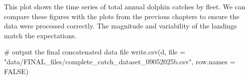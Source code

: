 \documentclass[
  letterpaper,
  oneside,
  open=any]{scrbook}
\newenvironment{Shaded}{\begin{snugshade}}{\end{snugshade}}
\newcommand{\AttributeTok}[1]{\textcolor[rgb]{0.40,0.45,0.13}{#1}}
\newcommand{\CommentTok}[1]{\textcolor[rgb]{0.37,0.37,0.37}{#1}}
\newcommand{\ConstantTok}[1]{\textcolor[rgb]{0.56,0.35,0.01}{#1}}
\newcommand{\FunctionTok}[1]{\textcolor[rgb]{0.28,0.35,0.67}{#1}}
\newcommand{\NormalTok}[1]{\textcolor[rgb]{0.00,0.23,0.31}{#1}}
\newcommand{\StringTok}[1]{\textcolor[rgb]{0.13,0.47,0.30}{#1}}
\begin{document}
This plot shows the time series of total annual dolphin catches by
fleet. We can compare these figures with the plots from the previous
chapters to ensure the data were processed correctly. The magnitude and
variability of the landings match the expectations.

\begin{Shaded}
\begin{Highlighting}[]
\CommentTok{\# output the final concatenated data file}
\FunctionTok{write.csv}\NormalTok{(d, }\AttributeTok{file =} \StringTok{"data/FINAL\_files/complete\_catch\_dataset\_09052025b.csv"}\NormalTok{, }\AttributeTok{row.names =} \ConstantTok{FALSE}\NormalTok{)}
\end{Highlighting}
\end{Shaded}



\backmatter
\end{document}
